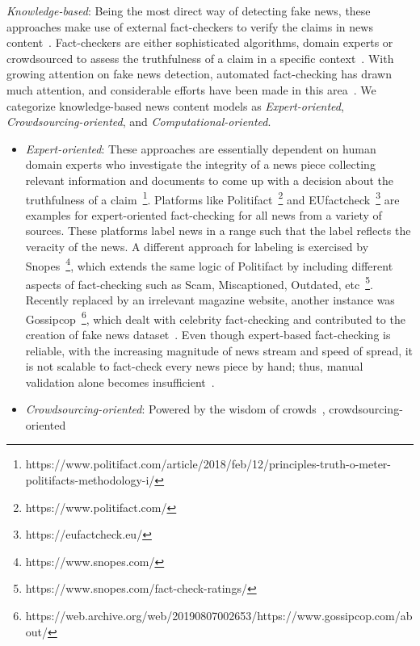 \begin{description}
    \item{\emph{Knowledge-based}}: Being the most direct way of detecting fake news, these approaches make use of external fact-checkers to verify the claims in news content~\parencite{FakeNewsDetectionOnSocialMediaADataMiningPerspective_Shu}. Fact-checkers are either sophisticated algorithms, domain experts or crowdsourced to assess the truthfulness of a claim in a specific context~\parencite{FactChecking_Vlachos}. With growing attention on fake news detection, automated fact-checking has drawn much attention, and considerable efforts have been made in this area~\parencite{AutomatedFactChecking_Thorne, OverviewOfCheckThat_Barroncede}. We categorize knowledge-based news content models as \emph{Expert-oriented}, \emph{Crowdsourcing-oriented}, and \emph{Computational-oriented}.
    \begin{itemize}
        \item \emph{Expert-oriented}: These approaches are essentially dependent on human domain experts who investigate the integrity of a
              news piece collecting relevant information and documents to come up with a decision about the truthfulness of a
              claim~\footnote{https://www.politifact.com/article/2018/feb/12/principles-truth-o-meter-politifacts-methodology-i/}. Platforms
              like Politifact~\footnote{https://www.politifact.com/} and EUfactcheck~\footnote{https://eufactcheck.eu/} are examples for expert-oriented fact-checking for all news from a variety of sources. These platforms label news in a range such that the label reflects the veracity of the news. A different approach for labeling is exercised by Snopes~\footnote{https://www.snopes.com/},
              which extends the same logic of Politifact by including different aspects of fact-checking such as Scam, Miscaptioned, Outdated, etc~\footnote{https://www.snopes.com/fact-check-ratings/}. Recently replaced by an irrelevant magazine website, another instance
              was Gossipcop~\footnote{https://web.archive.org/web/20190807002653/https://www.gossipcop.com/about/}, which dealt with celebrity fact-checking and contributed to the creation of fake news dataset~\parencite{FakeNewsNet_Shu}. Even though expert-based
              fact-checking is reliable, with the increasing magnitude of news stream and speed of spread, it is not scalable to fact-check every news piece by hand; thus, manual validation alone becomes insufficient~\parencite{ASurveyOnAutomatedFactChecking_Guo}.
        \item \emph{Crowdsourcing-oriented}: Powered by the wisdom of crowds~\parencite{WisdomOfCrowds_Galton}, crowdsourcing-oriented

\end{itemize}
\end{description}
